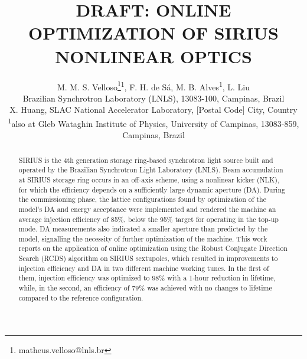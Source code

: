 \documentclass[a4paper,
               keeplastbox,   %
               ]{jacow}
\begin{document}
\title{DRAFT: ONLINE OPTIMIZATION OF SIRIUS NONLINEAR OPTICS}

\author{M. M. S. Velloso\thanks{matheus.velloso@lnls.br}\textsuperscript{1}, F. H. de Sá, M. B. Alves\textsuperscript{1}, L. Liu\\ Brazilian Synchrotron Laboratory (LNLS), 13083-100, Campinas, Brazil \\
		X. Huang, SLAC National Accelerator Laboratory, [Postal Code] City, Country \\
		\textsuperscript{1}also at Gleb Wataghin Institute of Physics, University of Campinas, 13083-859, Campinas, Brazil 
}
	
\maketitle
%
\begin{abstract}
SIRIUS is the 4th generation storage ring-based synchrotron light source built and operated by the Brazilian Synchrotron Light Laboratory (LNLS). Beam accumulation at SIRIUS storage ring occurs in an off-axis scheme, using a nonlinear kicker (NLK), for which the efficiency depends on a sufficiently large dynamic aperture (DA). During the commissioning phase, the lattice configurations found by optimization of the model's DA and energy acceptance were implemented and rendered the machine an average injection efficiency of 85\%,  below the 95\% target for operating in the top-up mode. DA measurements also indicated a smaller aperture than predicted by the model, signalling the necessity of further optimization of the machine. 
This work reports on the application of online optimization using the Robust Conjugate Direction Search (RCDS) algorithm on SIRIUS sextupoles, which resulted in improvements to injection efficiency and DA in two different machine working tunes. In the first of them, injection efficiency was optimized to $98\%$ with a 1-hour reduction in lifetime, while, in the second, an efficiency of $79\%$ was achieved with no changes to lifetime compared to the reference configuration.
\end{abstract}

\end{document}
